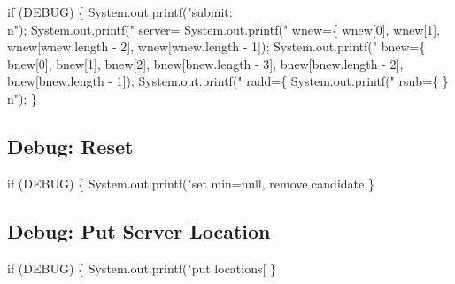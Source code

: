 \nwenddocs{}\endmoddef\nwstartdeflinemarkup{}\nwenddeflinemarkup
if (DEBUG) \{
  System.out.printf("submit:\\n");
  System.out.printf("  server=%
  System.out.printf("  wnew=\{ %
      wnew[0], wnew[1], wnew[wnew.length - 2], wnew[wnew.length - 1]);
  System.out.printf("  bnew=\{ %
      bnew[0], bnew[1], bnew[2],
      bnew[bnew.length - 3], bnew[bnew.length - 2], bnew[bnew.length - 1]);
  System.out.printf("  radd=\{ %
  System.out.printf("  rsub=\{ \}\\n");
\}
\nwendcode{}\nwdocspar

\subsection{Debug: Reset}

\nwenddocs{}\endmoddef\nwstartdeflinemarkup{}\nwenddeflinemarkup
if (DEBUG) \{
  System.out.printf("set min=null, remove candidate %
\}
\nwendcode{}\nwdocspar

\subsection{Debug: Put Server Location}

\nwenddocs{}\endmoddef\nwstartdeflinemarkup{}\nwenddeflinemarkup
if (DEBUG) \{
  System.out.printf("put locations[%
\}
\nwendcode{}\nwdocspar

